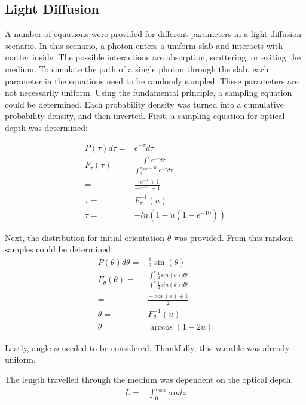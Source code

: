 \documentclass[twocolumn]{article}
\begin{document}
\subsection{Light Diffusion}
A number of equations were provided for different parameters in a light diffusion scenario. In this scenario, a photon enters a uniform slab and interacts with matter inside. The possible interactions are absorption, scattering, or exiting the medium. To simulate the path of a single photon through the slab, each parameter in the equations need to be randomly sampled. These parameters are not necessarily uniform. Using the fundamental principle, a sampling equation could be determined. Each probability density was turned into a cumulative probability density, and then inverted. First, a sampling equation for optical depth was determined:

\begin{equation}
\label{eq:tau_sample}
\begin{split}
P(\tau) d\tau =& e^{-\tau} d\tau \\
F_{\tau} (\tau) =& \frac{\int_{0}^{x} e^{-\tau} d\tau}{\int_{0}^{\tau_{max} = 10} e^{-\tau} d\tau}\\
				=& \frac{-e^{-x} + 1}{-e^{-10} + 1}\\
\tau =& F^{-1}_{\tau}(u) \\
\tau =& -ln(1-u(1-e^{-10}))
\end{split}
\end{equation}

Next, the distribution for initial orientation $\theta$ was provided. From this random samples could be determined:
\begin{equation}
\label{eq:theta_sample}
\begin{split}
P(\theta) d\theta =& \frac{1}{2} \sin(\theta) \\
F_{\theta} (\theta) =& \frac{\int_{0}^{x} \frac{1}{2} sin(\theta) d\theta}{\int_{0}^{\pi} \frac{1}{2} sin(\theta) d\theta}\\
					=& \frac{-\cos(x) + 1}{2}\\
\theta =& F^{-1}_{\theta}(u) \\
\theta =& \arccos(1-2u)
\end{split}
\end{equation}

Lastly, angle $\phi$ needed to be considered. Thankfully, this variable was already uniform.


The length travelled through the medium was dependent on the optical depth.
\begin{equation}
\begin{split}
L =& \int_{0}^{\tau_{max}}\sigma n dz \\
\end{split}
\end{equation}
\end{document}
